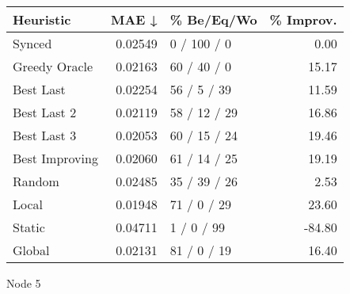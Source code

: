 \begin{tabular}{lrlr}
\toprule
\textbf{Heuristic} & \textbf{MAE ↓} & \textbf{\% Be/Eq/Wo} & \textbf{\% Improv.} \\
\midrule
            Synced &        0.02549 &          0 / 100 / 0 &                0.00 \\
     Greedy Oracle &        0.02163 &          60 / 40 / 0 &               15.17 \\
         Best Last &        0.02254 &          56 / 5 / 39 &               11.59 \\
       Best Last 2 &        0.02119 &         58 / 12 / 29 &               16.86 \\
       Best Last 3 &        0.02053 &         60 / 15 / 24 &               19.46 \\
    Best Improving &        0.02060 &         61 / 14 / 25 &               19.19 \\
            Random &        0.02485 &         35 / 39 / 26 &                2.53 \\
             Local &        0.01948 &          71 / 0 / 29 &               23.60 \\
            Static &        0.04711 &           1 / 0 / 99 &              -84.80 \\
            Global &        0.02131 &          81 / 0 / 19 &               16.40 \\
\bottomrule
\end{tabular}
\caption{Node 5}
\label{tab:non_lr01_le2_bs2_5}
